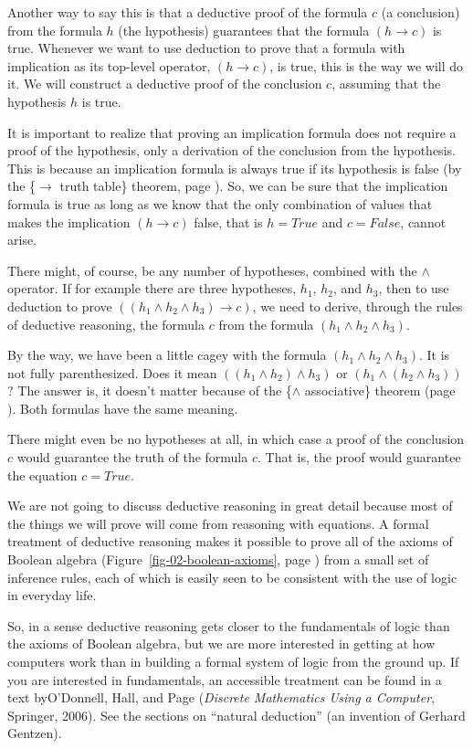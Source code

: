 Another way to say this is that a deductive proof of the formula $c$ (a conclusion)
from the formula $h$ (the hypothesis) guarantees that the formula
$(h \rightarrow c)$ is true.
Whenever we want to use deduction to prove that a formula with implication as its
top-level operator, $(h \rightarrow c)$, is true, this is the way we will do it.
We will construct a deductive proof of the conclusion $c$, assuming that
the hypothesis $h$ is true.

It is important to realize that proving an implication formula does
not require a proof of the hypothesis, only a derivation of the conclusion
from the hypothesis. This is because an implication formula is always
true if its hypothesis is false (by the \{$\rightarrow$ truth table\} theorem,
page \pageref{implication-truth-table}).
So, we can be sure that the implication formula is true as long as
we know that the only combination of values that makes the implication
$(h \rightarrow c)$ false, that is $h = True$ and $c = False$, cannot arise.

There might, of course, be any number of hypotheses, combined with
the $\wedge$ operator. If for example there are three hypotheses,
$h_1$, $h_2$, and $h_3$, then to use deduction to prove
$((h_1 \wedge h_2 \wedge h_3) \rightarrow c)$, we need to derive,
through the rules of deductive reasoning, the formula $c$ from
the formula $(h_1 \wedge h_2 \wedge h_3)$.

By the way, we have been a little cagey with the formula
$(h_1 \wedge h_2 \wedge h_3)$. It is not fully parenthesized.
Does it mean $((h_1 \wedge h_2) \wedge h_3)$ or
$(h_1 \wedge (h_2 \wedge h_3))$?
The answer is, it doesn't matter because of the \{$\wedge$ associative\}
theorem (page \pageref{and-associative}).
Both formulas have the same meaning.

There might even be no hypotheses at all, in which case a proof of the
conclusion $c$ would guarantee the truth of the formula
$c$. That is, the proof would guarantee the equation $c = True$.

We are not going to discuss deductive reasoning in great detail
because most of the things we will prove will come from reasoning
with equations. A formal treatment of deductive reasoning makes it
possible to prove all of the axioms of Boolean algebra
(Figure~\ref{fig-02-boolean-axioms}, page \pageref{fig-02-boolean-axioms})
from a small set of inference rules,
each of which is easily seen to be consistent with the use of logic in everyday life.

So, in a sense deductive reasoning gets closer to the fundamentals of
logic than the axioms of Boolean algebra, but we are more interested in getting at how
computers work than in building a formal system of logic from the ground up.
If you are interested in fundamentals, an accessible treatment can be found
in a text byO'Donnell, Hall, and Page
(\emph{Discrete Mathematics Using a Computer}, Springer, 2006).
See the sections on ``natural deduction'' (an invention of Gerhard Gentzen).

